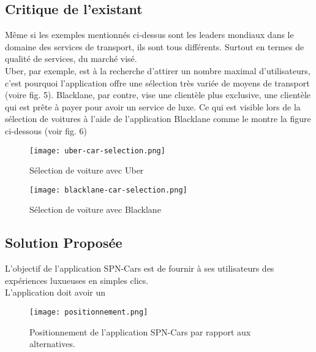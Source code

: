 \subsection{Critique de l'existant}
Même si les exemples mentionnés ci-dessus sont les leaders mondiaux dans le domaine des services de transport, ils sont tous différents. Surtout en termes de qualité de services, du marché visé.\\
\noindent Uber, par exemple, est à la recherche d'attirer un nombre maximal d'utilisateurs, c'est pourquoi l'application offre une sélection très variée de moyens de transport (voire fig. 5). Blacklane, par contre, vise une clientèle plus exclusive, une clientèle qui est prête à payer pour avoir un service de luxe. Ce qui est visible lors de la sélection de voitures à l'aide de l'application Blacklane comme le montre la figure ci-dessous (voir fig. 6)
\vspace{1cm}
\clearpage
\begin{multicols}{2}
    \begin{figure}[H]
        \centering
        \texttt{[image: uber-car-selection.png]}
        \vspace{1cm}
        \captionsetup{justification=centering}
        \caption{Sélection de voiture avec Uber}
        \label{fig:uber_selection}
    \end{figure}
    \begin{figure}[H]
        \centering
        \texttt{[image: blacklane-car-selection.png]}
        \vspace{1cm}
        \captionsetup{justification=centering}
        \caption{Sélection de voiture avec Blacklane}
        \label{fig:blacklane_selection}
    \end{figure}
\end{multicols}
\subsection{Solution Proposée}
L'objectif de l'application SPN-Cars est de fournir à ses utilisateurs des expériences luxueuses en simples clics.\\
L'application doit avoir un
\begin{figure}[H]
    \centering
    \texttt{[image: positionnement.png]}
    \vspace{1cm}
    \caption{Positionnement de l'application SPN-Cars par rapport aux alternatives.}
    \label{fig:positionnement_marcha}
\end{figure}
